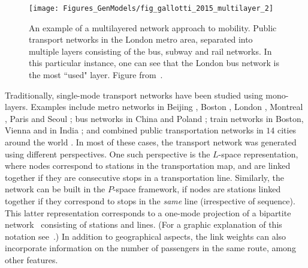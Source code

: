 \begin{figure}[t!]
\centering
\texttt{[image: Figures\_GenModels/fig\_gallotti\_2015\_multilayer\_2]}
\caption{An example of a multilayered network approach to mobility. Public transport networks in the London metro area, separated into multiple layers consisting of the bus, subway and rail networks. In this particular instance, one can see that the London bus network is the most ``used" layer. Figure from~\cite{gallotti_2015_multilayer}. }
\label{fig:gallotti_2015_multilayer_2}
\end{figure}

Traditionally, single-mode transport networks have been studied using mono-layers. Examples include metro networks in Beijing \cite{feng_2017_weighted}, Boston \cite{latora_2002_boston}, London \cite{angeloudis_2006_large,guo_2016_london}, Montreal \cite{derrible_2010_complexity}, Paris \cite{angeloudis_2006_large} and Seoul \cite{lee_2008_statistical}; bus networks in China \cite{xu_2007_scaling,chen_2007_study} and Poland \cite{sienkiewicz_2005_statistical}; train networks in Boston, Vienna \cite{seaton_2004_stations} and in India \cite{sen_2003_small}; and combined public transportation networks in $14$ cities around the world \cite{vonferber_2009_public}. In most of these cases, the transport network was generated using different perspectives. One such perspective is the $L$-space representation, where nodes correspond to stations in the transportation map, and are linked together if they are consecutive stops in a transportation line. Similarly, the network can be built in the $P$-space framework, if nodes are stations linked together if they correspond to stops in the \emph{same} line (irrespective of sequence). This latter representation corresponds to a  one-mode projection of a bipartite network~\cite{Newman_book} consisting of stations and lines. (For a graphic explanation of this notation see~\cite{vonferber_2009_public}.) In addition to geographical aspects, the link weights can also incorporate information on the number of passengers in the same route, among other features. 

